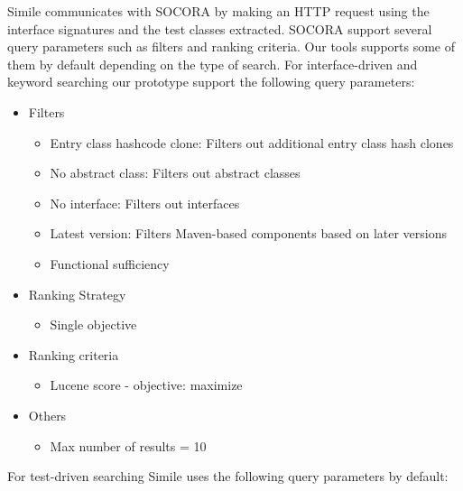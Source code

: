 Simile communicates with SOCORA by making an HTTP request using the interface signatures and the test classes extracted. SOCORA support several query parameters such as filters and ranking criteria. Our tools supports some of them by default depending on the type of search. For interface-driven and keyword searching our prototype support the following query parameters:

\begin{itemize}
\item Filters
	\begin{itemize}
	\item Entry class hashcode clone: Filters out additional entry class hash clones
	\item No abstract class: Filters out abstract classes
	\item No interface: Filters out interfaces
	\item Latest version: Filters Maven-based components based on later versions
	\item Functional sufficiency
	\end{itemize}
\item Ranking Strategy
	\begin{itemize}
	\item Single objective
	\end{itemize}
\item Ranking criteria
	\begin{itemize}
	\item Lucene score - objective: maximize
	\end{itemize}
\item Others
	\begin{itemize}
	\item Max number of results = 10
	\end{itemize}
\end{itemize}

For test-driven searching Simile uses the following query parameters by default:

